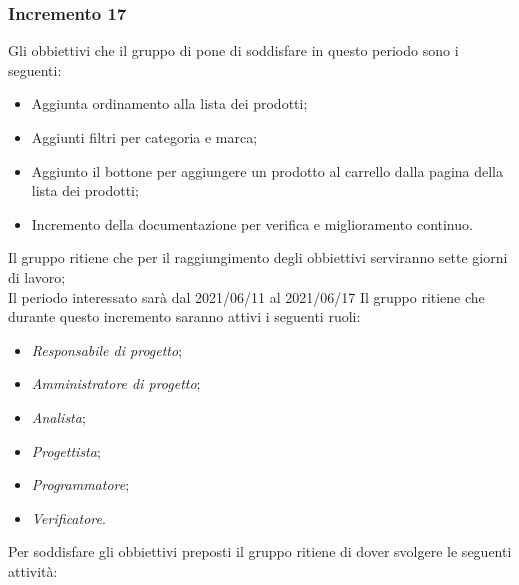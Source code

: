 \subsubsection{Incremento 17}
Gli obbiettivi che il gruppo di pone di soddisfare in questo periodo sono i seguenti:
\begin{itemize}
    \item Aggiunta ordinamento alla lista dei prodotti;
    \item Aggiunti filtri per categoria e marca;
    \item Aggiunto il bottone per aggiungere un prodotto al carrello dalla pagina della lista dei prodotti;
    \item Incremento della documentazione per verifica e miglioramento continuo.
\end{itemize}
Il gruppo ritiene che per il raggiungimento degli obbiettivi serviranno sette giorni di lavoro;\\
Il periodo interessato sarà dal 2021/06/11 al 2021/06/17
Il gruppo ritiene che durante questo incremento saranno attivi i seguenti ruoli:
\begin{itemize}
    \item \textit{Responsabile di progetto};
    \item \textit{Amministratore di progetto};
    \item \textit{Analista};
    \item \textit{Progettista};
    \item \textit{Programmatore};
    \item \textit{Verificatore}.
\end{itemize}
Per soddisfare gli obbiettivi preposti il gruppo ritiene di dover svolgere le seguenti attività:
